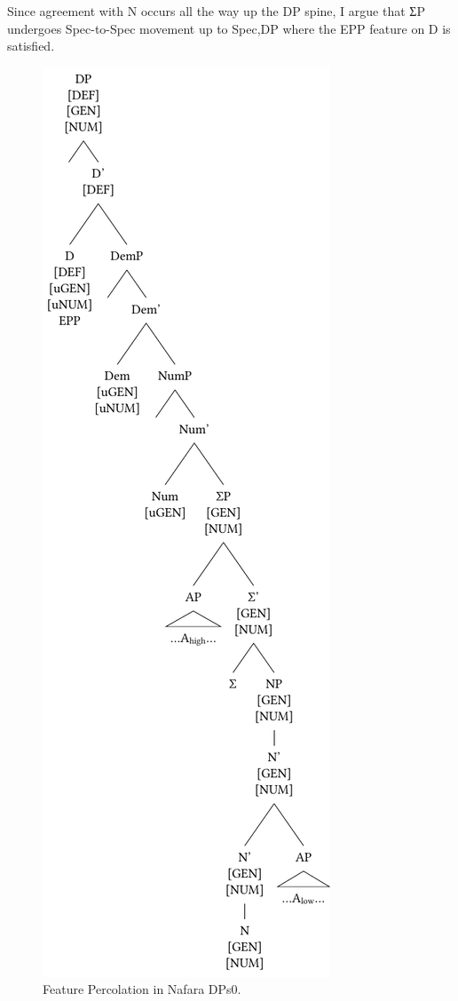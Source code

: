 \documentclass[output=paper]{langscibook}
\begin{document}
Since agreement with N occurs all the way up the DP spine, I argue that ƩP undergoes Spec-to-Spec movement up to Spec,DP where the EPP feature on D is satisfied.

  
\begin{figure}
\includegraphics[height=\textheight]{figures/baron-img4.pdf}
\caption{Feature Percolation in Nafara DPs0.}
\label{fig:baron:4}
\end{figure}
\end{document}
